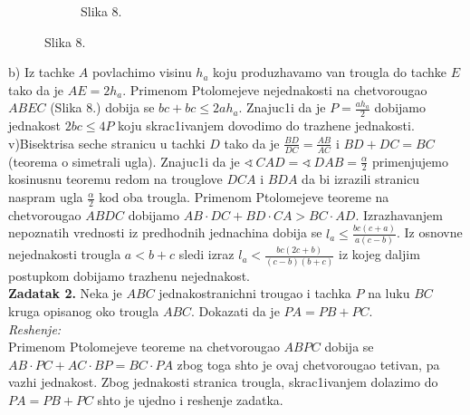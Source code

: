 \documentclass[11pt]{article}
\def\ug{\mathbin{\sphericalangle\,}}
\newcommand{\D}{\displaystyle}
\begin{document}
\begin{flushleft}
\begin{figure}[h!]
\begin{subfigure}{0.48\textwidth}
\caption*{Slika 8.} 
\end{subfigure}
\end{figure}
b) Iz tachke $A$ povlachimo visinu $h_a$ koju produzhavamo van trougla do tachke $E$ tako da je $AE=2h_a$. Primenom Ptolomejeve nejednakosti na chetvorougao $ABEC$ (Slika 8.) dobija se $bc+bc\leq 2ah_a$. Znajuc1i da je $\D P=\frac{ah_a}{2}$ dobijamo jednakost $2bc\leq 4P$ koju skrac1ivanjem dovodimo do trazhene jednakosti.\\
\vspace{0.1cm}
v)Bisektrisa seche stranicu u tachki $D$ tako da je $\D\frac{BD}{DC}=\frac{AB}{AC}$ i $BD+DC=BC$ (teorema o simetrali ugla). Znajuc1i da je $\D\ug CAD=\ug DAB =\frac{\alpha}{2}$ primenjujemo kosinusnu teoremu redom na trouglove $DCA$ i $BDA$ da bi izrazili stranicu naspram ugla $\D\frac{\alpha}{2}$ kod oba trougla. Primenom Ptolomejeve teoreme na chetvorougao $ABDC$ dobijamo $\D AB\cdot DC+BD\cdot CA>BC\cdot AD$. Izrazhavanjem nepoznatih vrednosti iz predhodnih jednachina dobija se $\D l_a\leq \frac{bc(c+a)}{a(c-b)}$. Iz osnovne nejednakosti trougla $a<b+c$ sledi izraz $\D l_a<\frac{bc(2c+b)}{(c-b)(b+c)}$ iz kojeg daljim postupkom dobijamo trazhenu nejednakost.\\
\vspace{0.3cm}
\textbf{Zadatak 2.} Neka je $ABC$ jednakostranichni trougao i tachka $P$ na luku $BC$ kruga opisanog oko trougla $ABC$. Dokazati da je $PA=PB+PC$.\\
\vspace{0.05cm}
\textit{Reshenje:}\\
\vspace{0.05cm}
Primenom Ptolomejeve teoreme na chetvorougao $ABPC$ dobija se $AB\cdot PC+AC\cdot BP=BC\cdot PA$ zbog toga shto je ovaj chetvorougao tetivan, pa vazhi jednakost. Zbog jednakosti stranica trougla, skrac1ivanjem dolazimo do $PA=PB+PC$ shto je ujedno i reshenje zadatka.
\end{flushleft}
\end{document}
